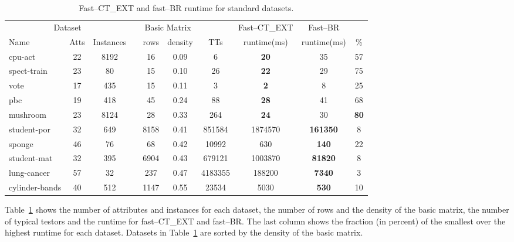 \documentclass[citenumber]{llncs}
\begin{document}
	\begin{table}[htb]
		\centering \footnotesize
		\caption{Fast--CT\_EXT and fast--BR runtime for standard datasets.}
		\label{tab:density}
		\begin{tabular}{lccccccccc}
			\hline
			\multicolumn{3}{c}{Dataset}& & \multicolumn{2}{c}{Basic Matrix} &&  \multicolumn{1}{c}{Fast--CT\_EXT} & \multicolumn{1}{c}{Fast--BR} \\
			\cline{1-3}\cline{5-6}
			Name   		     & Atts & Instances & & rows  & density  & TTs    & runtime(ms) & runtime(ms) & \%\\
			\hline
			cpu-act			 & 22   & 8192      & & 16    & 0.09     & 6       & \textbf{20} & 35              & 57 \\
			spect-train      & 23   & 80        & & 15    & 0.10     & 26      & \textbf{22} & 29              & 75 \\
			vote             & 17   & 435       & & 15    & 0.11     & 3       & \textbf{2}  & 8               & 25 \\
			pbc              & 19   & 418       & & 45    & 0.24     & 88      & \textbf{28} & 41              & 68 \\
			mushroom         & 23   & 8124      & & 28    & 0.33     & 264     & \textbf{24} & 30              & \textbf{80} \\
			student-por      & 32   & 649       & & 8158  & 0.41     & 851584  & 1874570     & \textbf{161350} & 8  \\
			sponge           & 46   & 76        & & 68    & 0.42     & 10992   & 630         & \textbf{140}    & 22 \\
			student-mat      & 32   & 395       & & 6904  & 0.43     & 679121  & 1003870     & \textbf{81820}  & 8  \\
			lung-cancer      & 57   & 32        & & 237   & 0.47     & 4183355 & 188200      & \textbf{7340}   & 3  \\
			cylinder-bands   & 40   & 512       & & 1147  & 0.55     & 23534   & 5030        & \textbf{530}    & 10 \\
			\hline
		\end{tabular}
	\end{table}
	
	Table~\ref{tab:density} shows the number of attributes and instances for each dataset, the number of rows and the density of the basic matrix, the number of typical testors and the runtime for fast--CT\_EXT and fast--BR. The last column shows the fraction (in percent) of the smallest over the highest runtime for each dataset. Datasets in Table~\ref{tab:density} are sorted by the density of the basic matrix. 
	
\end{document}
